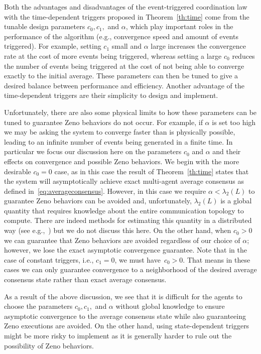 \documentclass{autart}
\begin{document}
Both the advantages and disadvantages of the event-triggered
coordination law with the time-dependent triggers
proposed in Theorem~\ref{th:time} come from the tunable design
parameters $c_0, c_1,$ and $\alpha$, which play  important roles
in the performance of the algorithm (e.g., convergence speed and
amount of events triggered). For example, setting $c_1$ small and
$\alpha$ large increases the convergence rate at the cost of more
events being triggered, whereas setting a large $c_0$ reduces the
number of events being triggered at the cost of not being able to
converge exactly to the initial average. These parameters can then be
tuned to give a desired balance between performance and efficiency.
Another advantage of the time-dependent triggers are their simplicity
to design and implement. 

Unfortunately, there are also some physical limits to how these
parameters can be tuned to guarantee Zeno behaviors do not occur. For
example, if $\alpha$ is set too high we may be asking the system to
converge faster than is physically possible, leading to an infinite
number of events being generated in a finite time. In particular we
focus our discussion here on the parameters $c_0$ and $\alpha$ and
their effects on convergence and possible Zeno behaviors. We begin
with the more desirable $c_0 = 0$ case, as in this case the result of
Theorem~\ref{th:time} states that the system will asymptotically
achieve exact multi-agent average consensus as defined
in~\eqref{eq:averageconsensus}. However, in this case we require
$\alpha < \lambda_2(L)$ to guarantee Zeno behaviors can be avoided
and, unfortunately, $\lambda_2(L)$ is a global quantity that requires
knowledge about the entire communication topology to compute. {There
  are indeed methods for estimating this quantity in a distributed way
  (see e.g.,~\cite{RA-GS-DVD-CS-KHJ:12,PY-RAF-GJG-KML-SSS-RS:10}) but
  we do not discuss this here.}  On the other hand, when $c_0 > 0$ we
can guarantee that Zeno behaviors are avoided regardless of our choice
of $\alpha$; however, we lose the exact asymptotic convergence
guarantee. Note that in the case of constant triggers, i.e.,
$c_1 = 0$, we must have~$c_0 > 0$. That means in these cases we can
only guarantee convergence to a neighborhood of the desired average
consensus state rather than exact average consensus.

As a result of the above discussion, we see that it is difficult for
the agents to choose the parameters $c_0, c_1,$ and $\alpha$ without
global knowledge to ensure asymptotic convergence to the average
consensus state while also guaranteeing Zeno executions are
avoided. On the other hand, using state-dependent triggers might be
more risky to implement as it is generally harder to rule out the
possibility of Zeno behaviors.
\end{document}
